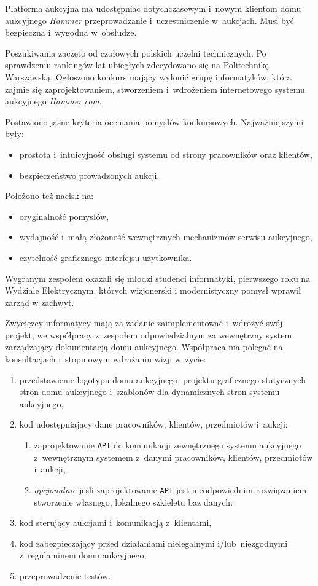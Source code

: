 \documentclass[10pt,a4paper]{article}
\begin{document}
Platforma aukcyjna ma udostępniać dotychczasowym i~nowym klientom domu
aukcyjnego \emph{Hammer} przeprowadzanie i~uczestniczenie w~aukcjach. Musi być
bezpieczna i~wygodna w~obsłudze.

Poszukiwania zaczęto od czołowych polskich uczelni technicznych. Po sprawdzeniu
rankingów lat ubiegłych zdecydowano się na Politechnikę Warszawską. Ogłoszono
konkurs mający wyłonić grupę informatyków, która zajmie się zaprojektowaniem,
stworzeniem i~wdrożeniem internetowego systemu aukcyjnego \emph{Hammer.com}.

\noindent Postawiono jasne kryteria oceniania pomysłów konkursowych.
Najważniejszymi były:
\begin{itemize}
  \item prostota i~intuicyjność obsługi systemu od strony pracowników oraz
    klientów,
  \item bezpieczeństwo prowadzonych aukcji.
\end{itemize}
Położono też nacisk na:
\begin{itemize}
  \item oryginalność pomysłów,
  \item wydajność i~małą złożoność wewnętrznych mechanizmów serwisu aukcyjnego,
  \item czytelność graficznego interfejsu użytkownika.
\end{itemize}   

Wygranym zespołem okazali się młodzi studenci informatyki, pierwszego roku na
Wydziale Elektrycznym, których wizjonerski i modernistyczny pomysł wprawił
zarząd w zachwyt.

Zwycięzcy informatycy mają za zadanie zaimplementować i~wdrożyć swój projekt,
we współpracy z~zespołem odpowiedzialnym za wewnętrzny system zarządzający
dokumentacją domu aukcyjnego. Współpraca ma polegać na konsultacjach
i~stopniowym wdrażaniu wizji w~życie:
\begin{enumerate}
  \item przedstawienie logotypu domu aukcyjnego, projektu graficznego
    statycznych stron domu aukcyjnego i~szablonów dla dynamicznych stron
    systemu aukcyjnego,
  \item kod udostępniający dane pracowników, klientów, przedmiotów i~aukcji:
  \begin{enumerate}
    \item zaprojektowanie \texttt{API} do komunikacji zewnętrznego systemu
      aukcyjnego z~wewnętrznym systemem z~danymi pracowników, klientów,
      przedmiotów i~aukcji,
    \item \emph{opcjonalnie} jeśli zaprojektowanie \texttt{API} jest
      nieodpowiednim rozwiązaniem, stworzenie własnego, lokalnego szkieletu baz
      danych.
  \end{enumerate}
  \item kod sterujący aukcjami i~komunikacją z~klientami,
  \item kod zabezpieczający przed działaniami nielegalnymi i/lub~niezgodnymi
    z~regulaminem domu aukcyjnego,
  \item przeprowadzenie testów.
\end{enumerate}
\end{document}
